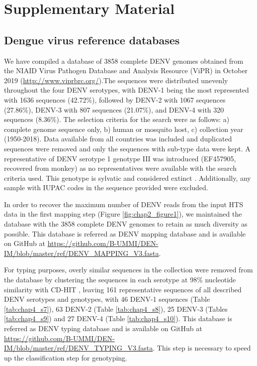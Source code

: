 \section{Supplementary Material}

\subsection{Dengue virus reference databases} \label{chap4_sup_database}

We have compiled a database of 3858 complete DENV genomes obtained from the NIAID Virus Pathogen Database and Analysis Resource (ViPR) in October 2019 \citep{pickett_virus_2012} (\url{http://www.viprbrc.org/}).The sequences were distributed unevenly throughout the four DENV serotypes, with DENV-1 being the most represented with 1636 sequences (42.72\%), followed by DENV-2 with 1067 sequences (27.86\%), DENV-3 with 807 sequences (21.07\%), and DENV-4 with 320 sequences (8.36\%). The selection criteria for the search were as follows: a) complete genome sequence only, b) human or mosquito host, c) collection year (1950-2018). Data available from all countries was included and duplicated sequences were removed and only the sequences with sub-type data were kept. A representative of DENV serotype 1 genotype III was introduced (EF457905, recovered from monkey) as no representatives were available with the search criteria used. This genotype is sylvatic and considered extinct \citep{villabona-arenas_worldwide_2013, vasilakis_history_2008}. Additionally, any sample with IUPAC codes in the sequence provided were excluded. 

In order to recover the maximum number of DENV reads from the input HTS data in the first mapping step (Figure \ref{fig:chap2_figure1}), we maintained the database with the 3858 complete DENV genomes to retain as much diversity as possible. This database is referred as DENV mapping database and is available on GitHub at \url{https://github.com/B-UMMI/DEN-IM/blob/master/ref/DENV_MAPPING_V3.fasta}. 

For typing purposes, overly similar sequences in the collection were removed from the database by clustering the sequences in each serotype at 98\% nucleotide similarity with CD-HIT \citep{li_cd-hit_2006}, leaving 161 representative sequences of all described DENV serotypes and genotypes, with 46 DENV-1 sequences (Table \ref{tab:chap4_s7}), 63 DENV-2 (Table \ref{tab:chap4_s8}), 25 DENV-3 (Tables \ref{tab:chap4_s9}) and 27 DENV-4 (Table \ref{tab:chap4_s10}). This database is referred as DENV typing database and is available on GitHub at \url{https://github.com/B-UMMI/DEN-IM/blob/master/ref/DENV_TYPING_V3.fasta}. This step is necessary to speed up the classification step for genotyping.

